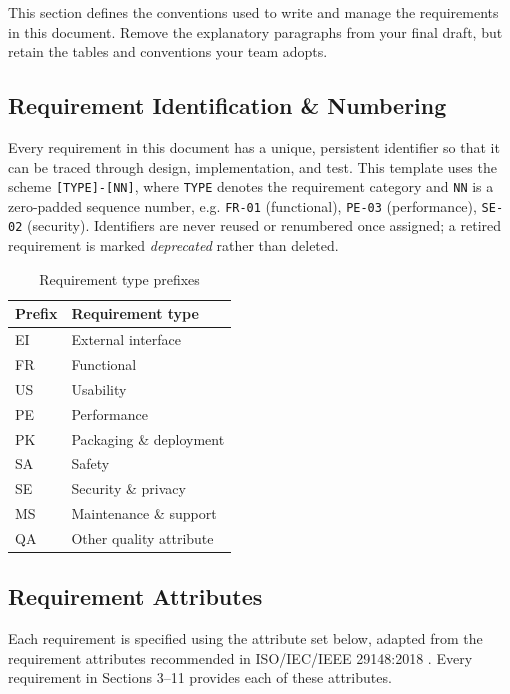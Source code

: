 This section defines the conventions used to write and manage the requirements in this document. Remove the explanatory paragraphs from your final draft, but retain the tables and conventions your team adopts.

\subsection{Requirement Identification \& Numbering}
Every requirement in this document has a unique, persistent identifier so that it can be traced through design, implementation, and test. This template uses the scheme \texttt{[TYPE]-[NN]}, where \texttt{TYPE} denotes the requirement category and \texttt{NN} is a zero-padded sequence number, e.g. \texttt{FR-01} (functional), \texttt{PE-03} (performance), \texttt{SE-02} (security). Identifiers are never reused or renumbered once assigned; a retired requirement is marked \textit{deprecated} rather than deleted.

\begin{table}[H]
\caption{Requirement type prefixes}
\begin{center}
    \begin{tabular}{ | p{2cm} | p{11cm} |}
    \hline
    \textbf{Prefix} & \textbf{Requirement type} \\ \hline
    EI & External interface \\ \hline
    FR & Functional \\ \hline
    US & Usability \\ \hline
    PE & Performance \\ \hline
    PK & Packaging \& deployment \\ \hline
    SA & Safety \\ \hline
    SE & Security \& privacy \\ \hline
    MS & Maintenance \& support \\ \hline
    QA & Other quality attribute \\ \hline
    \end{tabular}
\end{center}
\end{table}

\subsection{Requirement Attributes}
Each requirement is specified using the attribute set below, adapted from the requirement attributes recommended in ISO/IEC/IEEE 29148:2018 \cite{ISO29148}. Every requirement in Sections 3--11 provides each of these attributes.

